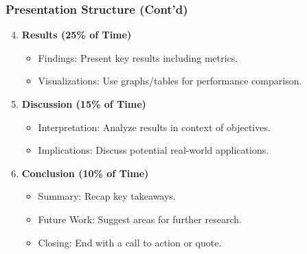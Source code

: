 \documentclass[aspectratio=169]{beamer}
\begin{document}
\begin{frame}
  \frametitle{Presentation Structure (Cont'd)}
  \begin{enumerate}
    \setcounter{enumi}{3}
    \item \textbf{Results (25\% of Time)}
      \begin{itemize}
        \item Findings: Present key results including metrics.
        \item Visualizations: Use graphs/tables for performance comparison.
      \end{itemize}
      
    \item \textbf{Discussion (15\% of Time)}
      \begin{itemize}
        \item Interpretation: Analyze results in context of objectives.
        \item Implications: Discuss potential real-world applications.
      \end{itemize}

    \item \textbf{Conclusion (10\% of Time)}
      \begin{itemize}
        \item Summary: Recap key takeaways.
        \item Future Work: Suggest areas for further research.
        \item Closing: End with a call to action or quote.
      \end{itemize}
  \end{enumerate}
\end{frame}
\end{document}
